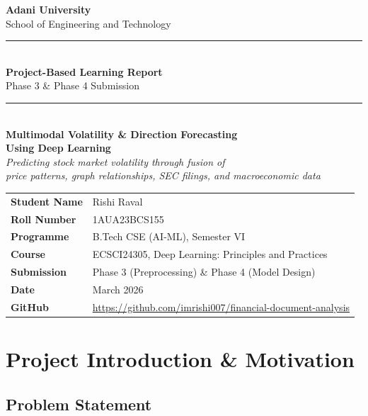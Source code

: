 \documentclass[12pt,a4paper]{article}
\begin{document}
\begin{titlepage}
\centering
\vspace*{1.5cm}
{\Large \textbf{Adani University}\\[0.3cm]
\large School of Engineering and Technology}\\[1cm]
\rule{\linewidth}{1pt}\\[0.5cm]
{\LARGE \textbf{Project-Based Learning Report}}\\[0.3cm]
{\large Phase 3 \& Phase 4 Submission}\\[0.3cm]
\rule{\linewidth}{1pt}\\[1cm]

{\Large \textbf{Multimodal Volatility \& Direction Forecasting\\
Using Deep Learning}}\\[0.5cm]

{\large \textit{Predicting stock market volatility through fusion of\\
price patterns, graph relationships, SEC filings, and macroeconomic data}}\\[1.5cm]

\begin{tabular}{ll}
\textbf{Student Name}   & Rishi Raval \\[0.3cm]
\textbf{Roll Number}    & 1AUA23BCS155 \\[0.3cm]
\textbf{Programme}      & B.Tech CSE (AI-ML), Semester VI \\[0.3cm]
\textbf{Course}         & ECSCI24305, Deep Learning: Principles and Practices \\[0.3cm]
\textbf{Submission}     & Phase 3 (Preprocessing) \& Phase 4 (Model Design) \\[0.3cm]
\textbf{Date}           & March 2026 \\[0.3cm]
\textbf{GitHub}         & \url{https://github.com/imrishi007/financial-document-analysis}
\end{tabular}

\vfill
\end{titlepage}

\tableofcontents
\newpage

\section{Project Introduction \& Motivation}
\subsection{Problem Statement}
\end{document}
